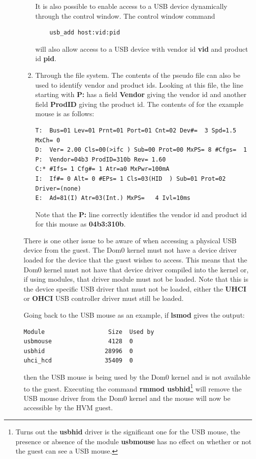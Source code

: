 \documentclass[11pt,twoside,final,openright]{report}
\begin{document}
\begin{description}
\begin{enumerate}
It is also possible to
enable access to a USB
device dynamically through
the control window.
The control window command
{\small
\begin{verbatim}
    usb_add host:vid:pid
\end{verbatim}
}
will also allow access to a
USB device with vendor id
\textbf{vid}
and product id
\textbf{pid}.
\item Through the
 file system.
The contents of the pseudo file
can also be used to identify
vendor and product ids.
Looking at this file,
the line starting with
\textbf{P:}
has a field
\textbf{Vendor}
giving the vendor id and
another field
\textbf{ProdID}
giving the product id.
The contents of
for the example mouse is as
follows:
{\small
\begin{verbatim}
T:  Bus=01 Lev=01 Prnt=01 Port=01 Cnt=02 Dev#=  3 Spd=1.5 MxCh= 0
D:  Ver= 2.00 Cls=00(>ifc ) Sub=00 Prot=00 MxPS= 8 #Cfgs=  1
P:  Vendor=04b3 ProdID=310b Rev= 1.60
C:* #Ifs= 1 Cfg#= 1 Atr=a0 MxPwr=100mA
I:  If#= 0 Alt= 0 #EPs= 1 Cls=03(HID  ) Sub=01 Prot=02 Driver=(none)
E:  Ad=81(I) Atr=03(Int.) MxPS=   4 Ivl=10ms
\end{verbatim}
}
Note that the
\textbf{P:}
line correctly identifies the
vendor id and product id
for this mouse as
\textbf{04b3:310b}.
\end{enumerate}
There is one other issue to
be aware of when accessing a
physical USB device from the guest.
The Dom0 kernel must not have
a device driver loaded for
the device that the guest wishes
to access.
This means that the Dom0
kernel must not have that
device driver compiled into
the kernel or,
if using modules,
that driver module must
not be loaded.
Note that this is the device
specific USB driver that must
not be loaded,
either the
\textbf{UHCI}
or
\textbf{OHCI}
USB controller driver must
still be loaded.

Going back to the USB mouse
as an example,
if \textbf{lsmod}
gives the output:

{\small
\begin{verbatim}
Module                  Size  Used by
usbmouse                4128  0 
usbhid                 28996  0
uhci_hcd               35409  0
\end{verbatim}
}

then the USB mouse is being
used by the Dom0 kernel and is
not available to the guest.
Executing the command
\textbf{rmmod usbhid}\footnote{
Turns out the
\textbf{usbhid}
driver is the significant
one for the USB mouse,
the presence or absence of
the module
\textbf{usbmouse}
has no effect on whether or
not the guest can see a USB mouse.}
will remove the USB mouse
driver from the Dom0 kernel
and the mouse will now be
accessible by the HVM guest.


\end{description}
\end{document}
